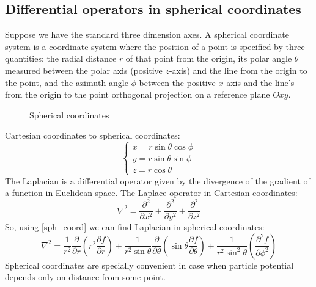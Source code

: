 \documentclass[a4paper, 11pt]{article}
\begin{document}
\subsection{Differential operators in spherical coordinates}\label{dif_op_3d}
Suppose we have the standard three dimension axes. A spherical coordinate system is a coordinate system where the position of a point is specified by three quantities: the radial distance $r$ of that point from the origin, its polar angle $\theta$ measured between the polar axis (positive $z$-axis) and the line from the origin to the point, and the azimuth angle $\phi$ between the positive $x$-axis  and the line's from the origin to the point orthogonal projection on a reference plane $Oxy$.


%
%
\begin{figure}[h!]
\begin{center}
\end{center}
\caption{Spherical coordinates}
\end{figure}
Cartesian coordinates to spherical coordinates:
\begin{equation} \label{sph_coord}
\begin{cases}
	{x}= {r} \sin{\theta}\cos{\phi} \\
	{y} = {r} \sin{\theta}\sin{\phi} \\
	{z} = {r}\cos{\theta}
\end{cases}
\end{equation}
The Laplacian is a differential operator given by the divergence of the gradient of a function in Euclidean space. The Laplace operator in Cartesian coordinates:
 	$$\nabla^2= \frac{\partial^2}{\partial x^2}  + \frac{\partial^2}{\partial y^2} + \frac{\partial^2}{\partial z^2}$$
So, using \eqref{sph_coord} we can find Laplacian in spherical coordinates:
\begin{equation}\label{sph_lap}
	\nabla^2 = \frac{1}{r^2} \frac{\partial}{\partial r}({r^2}\frac{\partial f}{\partial r})+\frac{1}{r^2\sin{\theta}}\frac{\partial}{\partial \theta}(\sin{\theta}\frac{\partial f}{\partial \theta})+\frac{1}{r^2\sin^2{\theta}}(\frac{\partial^2 f}{\partial \phi^2})
\end{equation}
Spherical coordinates are specially convenient in case when particle potential depends only on distance from some point.
\end{document}
